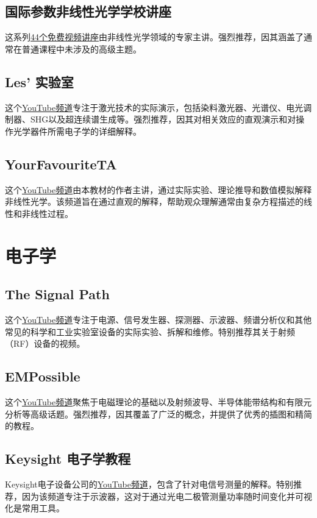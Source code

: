 \subsection*{国际参数非线性光学学校讲座}
这系列\href{https://www.youtube.com/@ispnlo9041/videos}{44个免费视频讲座}由非线性光学领域的专家主讲。强烈推荐，因其涵盖了通常在普通课程中未涉及的高级主题。

\subsection*{Les' 实验室}
这个\href{https://www.youtube.com/@LesLaboratory/videos}{YouTube频道}专注于激光技术的实际演示，包括染料激光器、光谱仪、电光调制器、SHG以及超连续谱生成等。强烈推荐，因其对相关效应的直观演示和对操作光学器件所需电子学的详细解释。

\subsection*{YourFavouriteTA}
这个\href{https://www.youtube.com/@yourfavouriteta/videos}{YouTube频道}由本教材的作者主讲，通过实际实验、理论推导和数值模拟解释非线性光学。该频道旨在通过直观的解释，帮助观众理解通常由复杂方程描述的线性和非线性过程。

\section{电子学}

\subsection*{The Signal Path}
这个\href{https://www.youtube.com/@Thesignalpath/videos}{YouTube频道}专注于电源、信号发生器、探测器、示波器、频谱分析仪和其他常见的科学和工业实验室设备的实际实验、拆解和维修。特别推荐其关于射频（RF）设备的视频。

\subsection*{EMPossible}
这个\href{https://www.youtube.com/@empossible1577/playlists}{YouTube频道}聚焦于电磁理论的基础以及射频波导、半导体能带结构和有限元分析等高级话题。强烈推荐，因其覆盖了广泛的概念，并提供了优秀的插图和精简的教程。

\subsection*{Keysight 电子学教程}
Keysight电子设备公司的\href{https://www.youtube.com/@KeysightLabs/videos}{YouTube频道}，包含了针对电信号测量的解释。特别推荐，因为该频道专注于示波器，这对于通过光电二极管测量功率随时间变化并可视化是常用工具。

